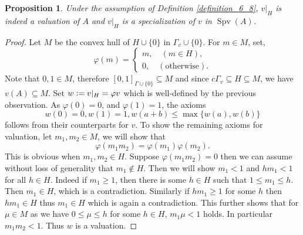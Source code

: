 \documentclass[8pt]{article}
\numberwithin{equation}{section}
\newtheorem{proposition}{Proposition}[subsection]
\DeclareMathOperator{\Spv}{Spv}
\newcommand{\defeq}{\vcentcolon=}
\newcommand{\cGamma}[0]{c\Gamma}
\begin{document}
\begin{proposition}
    \label{fact_7_8}
    Under the assumption of Definition \ref{definition_6_8}, $v|_H$ is indeed a valuation of $A$ and $v|_H$ is a specialization of $v$ in $\Spv(A)$.
\end{proposition}
\begin{proof}
    Let $M$ be the convex hull of $ H\cup\{0\}$ in $\Gamma_v\cup\{0\}$. For $m\in M$, set,
    \begin{equation*}
        \varphi(m) =\begin{cases}
            m,\quad(m\in H),\\
            0,\quad (\text{otherwise}).
        \end{cases}
    \end{equation*}
    Note that $0,1\in M$, therefore $[0,1]_{\Gamma\cup\{0\}}\subseteq M$ and since $\cGamma_v\subseteq H\subseteq M$, we have $v(A)\subseteq M$. %
    Set $w\defeq v|_H = \varphi v$ which is well-defined by the previous observation. %
    As $\varphi(0) = 0$, and $\varphi(1) = 1$, the axioms
    \begin{equation*}
        w(0) = 0,w(1) = 1,w(a+b)\leq\max\{w(a),w(b)\}
    \end{equation*}
    follows from their counterparts for $v$. To show the remaining axioms for valuation, let $m_1,m_2\in M$, we will show that 
    \begin{equation*}
    \varphi(m_1m_2) = \varphi(m_1)\varphi(m_2).
    \end{equation*} 
    This is obvious when $m_1,m_2\in H$. Suppose $\varphi(m_1m_2)=0$ then we can assume without loss of generality that $m_1\not\in H$. Then we will show $m_1<1$ and $hm_1<1$ for all $h\in H$. Indeed if $m_1\geq 1$, then there is some $h\in H$ such that $1\leq m_1\leq h$. Then $m_1\in H$, which is a contradiction. Similarly if $hm_1\geq 1$ for some $h$ then $hm_1\in H$ thus $m_1\in H$ which is again a contradiction. This further shows that for $\mu\in M$ as we have $0\leq \mu\leq h$ for some $h\in H$, $m_1\mu<1$ holds. In particular $m_1m_2<1$. Thus $w$ is a valuation. %

\end{proof}
\end{document}
